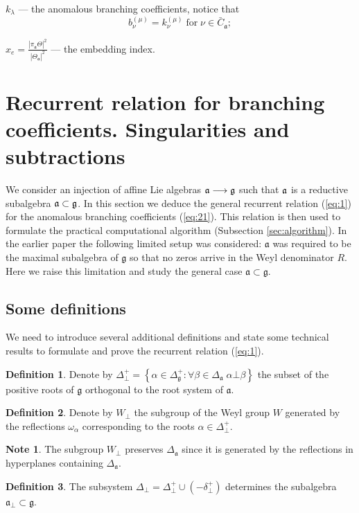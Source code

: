 \documentclass[12pt]{iopart}
\theoremstyle{definition}
\theoremstyle{definition}
\newtheorem{mynote}{Note}[section]
\theoremstyle{definition}
\newtheorem{definition}{Definition}
\begin{document}
 $k_{\lambda}$ --- the anomalous branching coefficients, notice that
\begin{equation*}
  b^{(\mu)}_{\nu}=k^{(\mu)}_{\nu} \; \mbox{for} \; \nu\in \bar{C}_{\mathfrak{a}};
\end{equation*}

$x_e=\frac{\left|\pi_{\mathfrak{a}} \Theta\right|^2}{\left|\Theta_{\mathfrak{a}}\right|^2}$ --- the embedding index.

\section{Recurrent relation for branching coefficients. Singularities and subtractions}
\label{sec:recurr-form-branch}

We consider an injection of affine Lie algebras $\frak{a}\longrightarrow \frak{g%
}$ such that $\frak{a}$ is a reductive subalgebra $\frak{a\subset g}$.
In this section we deduce the general recurrent relation (\ref{eq:1}) for the anomalous branching coefficients (\ref{eq:21}). This relation is then used to formulate the practical computational algorithm (Subsection \ref{sec:algorithm}).
In the earlier paper \cite{ilyin812pbc} the following limited setup was considered: $\mathfrak{a}$ was required to be the maximal subalgebra of $\mathfrak{g}$ so that no zeros arrive in the Weyl denominator $R$. Here we raise this limitation and study the general case $\mathfrak{a}\subset\mathfrak{g}$. 

\subsection{Some definitions}
\label{sec:some-definitions}

We need to introduce several additional definitions and state some technical results to formulate and prove the recurrent relation (\ref{eq:1}).

\begin{definition}
  Denote by $\Delta^{+}_{\bot}=\left\{\alpha\in \Delta^{+}_{\mathfrak{g}}:\forall \beta\in\Delta_{\mathfrak{a}} \; \alpha\bot \beta\right\}$ the subset of the positive roots of $\mathfrak{g}$ orthogonal to the root system of $\mathfrak{a}$.
\end{definition}

\begin{definition}
  Denote by $W_{\bot}$ the subgroup of the Weyl group $W$ generated by the reflections $\omega_{\alpha}$ corresponding to the roots $\alpha\in \Delta^{+}_{\bot}$.
\end{definition}
\begin{mynote}
  The subgroup $W_{\bot}$ preserves $\Delta_{\mathfrak{a}}$ since it is generated by the reflections in hyperplanes containing $\Delta_{\mathfrak{a}}$.
\end{mynote}
\begin{definition}
  The subsystem $\Delta_{\bot}=\Delta^{+}_{\bot}\cup \left(-\delta^{+}_{\bot}\right)$ determines the subalgebra $\mathfrak{a}_{\bot}\subset \mathfrak{g}$.
\end{definition}
\end{document}
